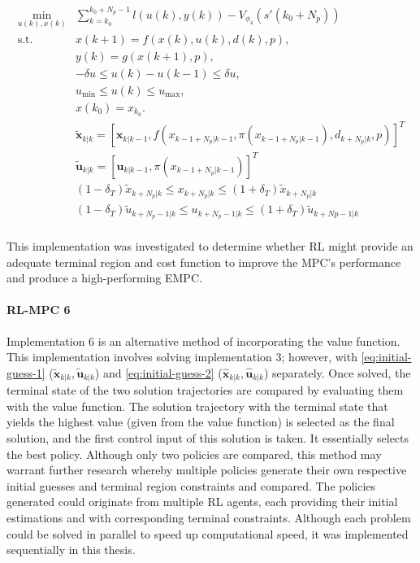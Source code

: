 \begin{subequations} \label{eq:rl-mpc-ocp}
	\begin{align}
		\min_{u(k),x(k)} & \sum_{k = k_0}^{k_0 + N_p-1} {l(u(k), y(k))} - V_{\phi_4}(s'(k_0+N_p)) \\
		\text{s.t.} \quad & x(k+1) = f(x(k), u(k), d(k), p),  \label{eq:rl-mpc-dynamics-constraint} \\
		& y(k) = g(x(k+1), p), \label{eq:rl-mpc-output-constraint} \\
		& -\delta u \leq u(k) - u(k-1) \leq \delta u, \label{eq:rl-mpc-delta-u} \\
		& u_{\min} \leq u(k) \leq u_{\max}, \label{eq:rl-mpc-u-limits}\\
		& x(k_0) = x_{k_0}. \label{eq:rl-pmc-initial} \\
 		&\tilde{\mathbf{x}}_{k|k} = [\mathbf{x}_{k|k-1},f(x_{k-1 + N_p|k-1}, \pi(x_{k-1 + N_p|k-1}), d_{k+N_p|k},p)]^T\\ 
		&\tilde{\mathbf{u}}_{k|k} = [\mathbf{u}_{k|k-1},\pi(x_{k-1 + N_p|k-1})]^T\\
		& (1-\delta_T)\tilde{x}_{k+N_p|k} \leq x_{k+N_p|k} \leq (1+\delta_T)\tilde{x}_{k+N_p|k}\\
		&(1-\delta_T)\tilde{u}_{k+N_p-1|k} \leq u_{k+N_p-1|k} \leq (1+\delta_T) \tilde{u}_{k+Np-1|k}\\
	\end{align}
\end{subequations}

This implementation was investigated to determine whether RL might provide an adequate terminal region and cost function to improve the MPC's performance and produce a high-performing EMPC. 


\paragraph{RL-MPC 6}
Implementation 6 is an alternative method of incorporating the value function. This implementation involves solving implementation 3; however, with \autoref{eq:initial-guess-1} ($\tilde{\mathbf{x}}_{k|k},\tilde{\mathbf{u}}_{k|k}$) and \autoref{eq:initial-guess-2} ($\hat{\mathbf{x}}_{k|k},\hat{\mathbf{u}}_{k|k}$) separately. Once solved, the terminal state of the two solution trajectories are compared by evaluating them with the value function. The solution trajectory with the terminal state that yields the highest value (given from the value function) is selected as the final solution, and the first control input of this solution is taken. It essentially selects the best policy. Although only two policies are compared, this method may warrant further research whereby multiple policies generate their own respective initial guesses and terminal region constraints and compared. The policies generated could originate from multiple RL agents, each providing their initial estimations and with corresponding terminal constraints. Although each problem could be solved in parallel to speed up computational speed, it was implemented sequentially in this thesis.



